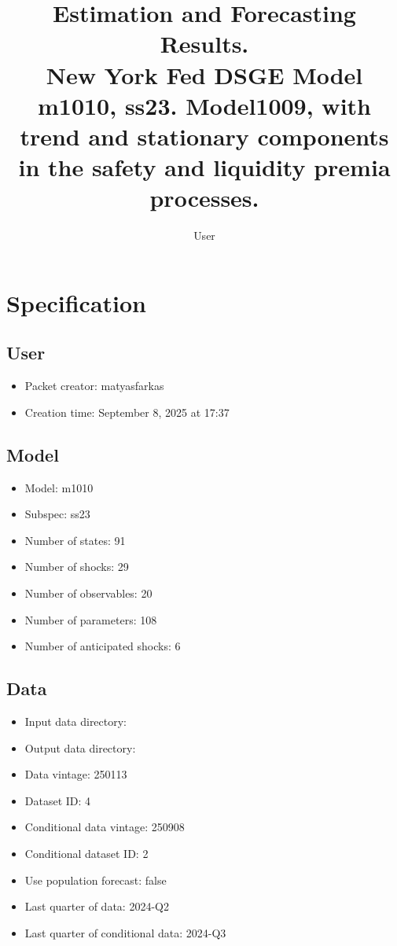 \documentclass{article}
\title{Estimation and Forecasting Results. \\ New York Fed DSGE Model m1010, ss23. Model1009, with trend and stationary components in the safety and liquidity premia processes.}
\author{User}
\begin{document}
\maketitle


\section{Specification}

\subsection{User}

\begin{itemize}
  \item Packet creator: matyasfarkas
  \item Creation time: September 8, 2025 at 17:37
\end{itemize}

\subsection{Model}

\begin{itemize}
  \item Model: m1010
  \item Subspec: ss23
  \item Number of states: 91
  \item Number of shocks: 29
  \item Number of observables: 20
  \item Number of parameters: 108
  \item Number of anticipated shocks: 6
\end{itemize}

\subsection{Data}

\begin{itemize}
  \item Input data directory: 
  \item Output data directory: 
  \item Data vintage: 250113
  \item Dataset ID: 4
  \item Conditional data vintage: 250908
  \item Conditional dataset ID: 2
  \item Use population forecast: false
  \item Last quarter of data: 2024-Q2
  \item Last quarter of conditional data: 2024-Q3
\end{itemize}
\end{document}
